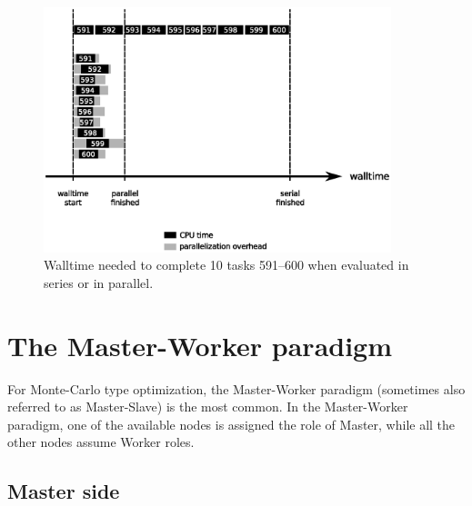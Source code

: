 \begin{figure}[htb]
  \centering
    \includegraphics[width=0.9\textwidth]{./../eps/serial-parallel-walltime.eps}
  \caption{Walltime needed to complete 10 tasks 591--600 when evaluated in series or in parallel.}
  \label{fig:walltime-comparison}
\end{figure}



\section{The Master-Worker paradigm}


For Monte-Carlo type optimization, the Master-Worker paradigm (sometimes also referred to as Master-Slave) is the most common. In the Master-Worker paradigm, one of the available nodes is assigned the role of Master, while all the other nodes assume Worker roles.
 
\subsection{Master side}


